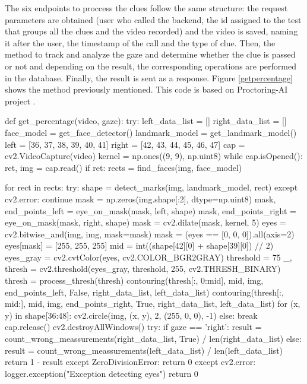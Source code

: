The six endpoints to proccess the clues follow the same structure: the request parameters are obtained (user who called the backend, the id assigned to the test that groups all the clues and the video recorded) and the video is saved, naming it after the user, the timestamp of the call and the type of clue. Then, the method to track and analyze the gaze and determine whether the clue is passed or not and depending on the result, the corresponding operations are performed in the database. Finally, the result is sent as a response. Figure \ref{getpercentage} shows the method previously mentioned. This code is based on Proctoring-AI project \cite{proctoringai}.


  \begin{python}[basicstyle=\footnotesize, caption={Method to track and analyze the gaze and determine whether the clue is passed or not}, captionpos=b, label={getpercentage}]
    def get_percentage(video, gaze):
    try:
        left_data_list = []
        right_data_list = []
        face_model = get_face_detector()
        landmark_model = get_landmark_model()
        left = [36, 37, 38, 39, 40, 41]
        right = [42, 43, 44, 45, 46, 47]
        cap = cv2.VideoCapture(video)
        kernel = np.ones((9, 9), np.uint8)
        while cap.isOpened():
            ret, img = cap.read()
            if ret:
                rects = find_faces(img, face_model)

                for rect in rects:
                    try:
                        shape = detect_marks(img, landmark_model, rect)
                    except cv2.error:
                        continue
                    mask = np.zeros(img.shape[:2], dtype=np.uint8)
                    mask, end_points_left = eye_on_mask(mask, left, shape)
                    mask, end_points_right = eye_on_mask(mask, right, shape)
                    mask = cv2.dilate(mask, kernel, 5)
                    eyes = cv2.bitwise_and(img, img, mask=mask)
                    mask = (eyes == [0, 0, 0]).all(axis=2)
                    eyes[mask] = [255, 255, 255]
                    mid = int((shape[42][0] + shape[39][0]) // 2)
                    eyes_gray = cv2.cvtColor(eyes, cv2.COLOR_BGR2GRAY)
                    threshold = 75
                    _, thresh = cv2.threshold(eyes_gray, threshold, 255, cv2.THRESH_BINARY)
                    thresh = process_thresh(thresh)
                    contouring(thresh[:, 0:mid], mid, img, end_points_left, False, right_data_list, left_data_list)
                    contouring(thresh[:, mid:], mid, img, end_points_right, True, right_data_list, left_data_list)
                    for (x, y) in shape[36:48]:
                        cv2.circle(img, (x, y), 2, (255, 0, 0), -1)
            else:
                break
        cap.release()
        cv2.destroyAllWindows()
        try:
            if gaze == 'right':
                result = count_wrong_meassurements(right_data_list, True) / len(right_data_list)
            else:
                 result = count_wrong_meassurements(left_data_list) / len(left_data_list)
            return 1 - result
        except ZeroDivisionError:
            return 0
    except cv2.error:
        logger.exception("Exception detecting eyes")
        return 0
  \end{python}

